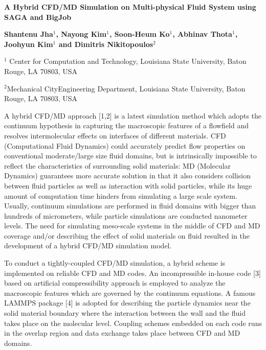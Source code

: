 \documentclass[a4paper]{article}
\begin{document}
\begin{center}


\textbf {\bf \large A Hybrid CFD/MD Simulation on Multi-physical Fluid System 
using SAGA and BigJob}
\vspace{12pt}

\textbf {Shantenu Jha$^1$, Nayong Kim$^1$, Soon-Heum Ko$^1$, Abhinav Thota$^1$, Joohyun Kim$^1$ and Dimitris Nikitopoulos$^2$}

\vspace{12pt}

\normalsize {$^1$ Center for Computation and Technology, \newline
Louisiana State University, Baton Rouge, LA 70803, USA}

\normalsize {$^2$Mechanical CityEngineering Department, \newline
Louisiana State University, Baton Rouge, LA 70803, USA}

\vspace{12pt}

\end{center}

A hybrid CFD/MD approach [1,2] is a latest simulation method which adopts the continuum hypothesis in capturing the macroscopic features of a flowfield and resolves intermolecular effects on interfaces of different materials. CFD (Computational Fluid Dynamics) could accurately predict flow properties on conventional moderate/large size fluid domains, but is intrinsically impossible to reflect the characteristics of surrounding solid materials: MD (Molecular Dynamics) guarantees more accurate solution in that it also considers collision between fluid particles as well as interaction with solid particles, while its huge amount of computation time hinders from simulating a large scale system. Usually, continuum simulations are performed in fluid domains with bigger than hundreds of micrometers, while particle simulations are conducted nanometer levels. The need for simulating meso-scale systems in the middle of CFD and MD coverage and/or describing the effect of solid materials on fluid resulted in the development of a hybrid CFD/MD simulation model.

To conduct a tightly-coupled CFD/MD simulation, a hybrid scheme is implemented on reliable CFD and MD codes. An incompressible in-house code [3] based on artificial compressibility approach is employed to analyze the macroscopic features which are governed by the continuum equations. A famous LAMMPS package [4] is adopted for describing the particle dynamics near the solid material boundary where the interaction between the wall and the fluid takes place on the molecular level. Coupling schemes embedded on each code runs in the overlap region and data exchange takes place between CFD and MD domains.
\end{document}

